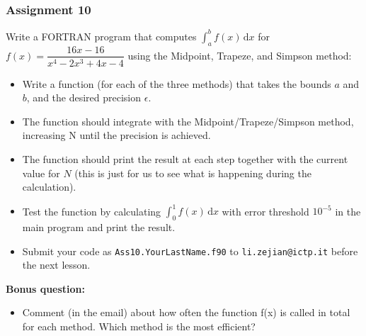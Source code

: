 \documentclass[11pt,aspectratio=169]{beamer}
\begin{document}
\begin{frame}
\frametitle{Assignment 10}
Write a FORTRAN program that computes $\int_a^b f(x)\, \mathrm{d}x$ for  $f(x) = \dfrac{16x-16}{x^4 - 2x^3+4x-4}$ using the Midpoint, Trapeze, and Simpson method:
\begin{itemize}
\item Write a function (for each of the three methods) that takes the bounds $a$ and $b$, and the desired precision $\epsilon$.
\pause
\item The function should integrate with the Midpoint/Trapeze/Simpson method, increasing N until the precision is achieved.
\pause
\item The function should print the result at each step together with the current value for $N$ (this is just for us to see what is happening during the calculation).
\pause
\item Test the function by calculating $\int_0^1 f(x)\, \mathrm{d}x$ with error threshold $10^{-5}$ in the main program and print the result.
\pause
\item Submit your code as \texttt{Ass10.YourLastName.f90} to \texttt{li.zejian@ictp.it} before the next lesson.
\end{itemize}
\textbf{Bonus question:}
\begin{itemize}
\item Comment (in the email) about how often the function f(x) is called in total for each method. Which method is the most efficient?
\end{itemize}
\end{frame}
\end{document}
